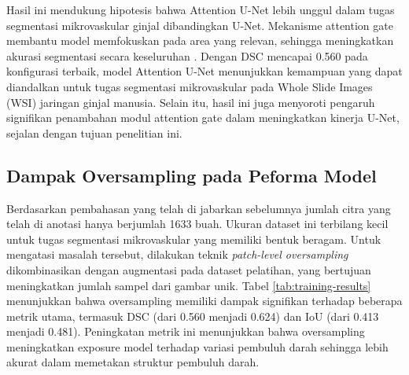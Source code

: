 \noindent Hasil ini mendukung hipotesis bahwa Attention U-Net lebih unggul dalam tugas segmentasi mikrovaskular ginjal dibandingkan U-Net. Mekanisme attention gate membantu model memfokuskan pada area yang relevan, sehingga meningkatkan akurasi segmentasi secara keseluruhan \cite{oktay_attention_2018}. Dengan DSC mencapai 0.560 pada konfigurasi terbaik, model Attention U-Net menunjukkan kemampuan yang dapat diandalkan untuk tugas segmentasi mikrovaskular pada Whole Slide Images (WSI) jaringan ginjal manusia. Selain itu, hasil ini juga menyoroti pengaruh signifikan penambahan modul attention gate dalam meningkatkan kinerja U-Net, sejalan dengan tujuan penelitian ini.


\subsection{Dampak Oversampling pada Peforma Model}


\noindent Berdasarkan pembahasan yang telah di jabarkan sebelumnya jumlah citra yang telah di anotasi hanya berjumlah 1633 buah. Ukuran dataset ini terbilang kecil untuk tugas segmentasi mikrovaskular yang memiliki bentuk beragam. Untuk mengatasi masalah tersebut, dilakukan teknik \textit{patch-level oversampling} dikombinasikan dengan augmentasi pada dataset pelatihan, yang bertujuan meningkatkan jumlah sampel dari gambar unik. Tabel \ref{tab:training-results} menunjukkan bahwa oversampling memiliki dampak signifikan terhadap beberapa metrik utama, termasuk DSC (dari 0.560 menjadi 0.624) dan IoU (dari 0.413 menjadi 0.481). Peningkatan metrik ini menunjukkan bahwa oversampling meningkatkan exposure model terhadap variasi pembuluh darah sehingga lebih akurat dalam memetakan struktur pembuluh darah. 


